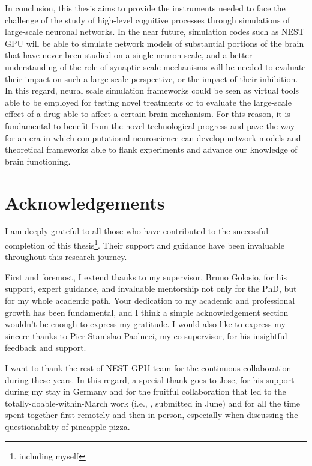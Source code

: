 \documentclass[a4paper, 12pt, twoside, openright]{book}
\begin{document}
In conclusion, this thesis aims to provide the instruments needed to face the challenge of the study of high-level cognitive processes through simulations of large-scale neuronal networks. In the near future, simulation codes such as NEST GPU will be able to simulate network models of substantial portions of the brain that have never been studied on a single neuron scale, and a better understanding of the role of synaptic scale mechanisms will be needed to evaluate their impact on such a large-scale perspective, or the impact of their inhibition. In this regard, neural scale simulation frameworks could be seen as virtual tools able to be employed for testing novel treatments or to evaluate the large-scale effect of a drug able to affect a certain brain mechanism. For this reason, it is fundamental to benefit from the novel technological progress and pave the way for an era in which computational neuroscience can develop network models and theoretical frameworks able to flank experiments and advance our knowledge of brain functioning.


\fancyfoot[C]{\thepage}
\fancyfoot[R]{}





\newpage
\null
\thispagestyle{empty}
\newpage
\chapter*{Acknowledgements}

I am deeply grateful to all those who have contributed to the successful completion of this thesis\footnote{including myself}. Their support and guidance have been invaluable throughout this research journey.

First and foremost, I extend thanks to my supervisor, Bruno Golosio, for his support, expert guidance, and invaluable mentorship not only for the PhD, but for my whole academic path. Your dedication to my academic and professional growth has been fundamental, and I think a simple acknowledgement section wouldn't be enough to express my gratitude. I would also like to express my sincere thanks to Pier Stanislao Paolucci, my co-supervisor, for his insightful feedback and support.

I want to thank the rest of NEST GPU team for the continuous collaboration during these years. In this regard, a special thank goes to Jose, for his support during my stay in Germany and for the fruitful collaboration that led to the totally-doable-within-March work (i.e., \cite{Golosio2023}, submitted in June) and for all the time spent together first remotely and then in person, especially when discussing the questionability of pineapple pizza.
\end{document}
